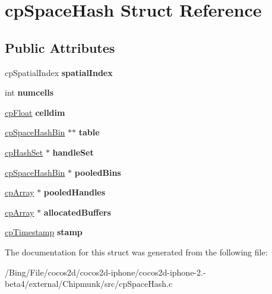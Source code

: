 \hypertarget{structcp_space_hash}{\section{cp\-Space\-Hash Struct Reference}
\label{structcp_space_hash}
}
\subsection*{Public Attributes}
\begin{DoxyCompactItemize}
\item 
\hypertarget{structcp_space_hash_a4d3a762b16dd13259a89dd29ad111676}{cp\-Spatial\-Index {\bfseries spatial\-Index}}\label{structcp_space_hash_a4d3a762b16dd13259a89dd29ad111676}

\item 
\hypertarget{structcp_space_hash_a54f58ef3898f1cc3cb07663b24d3ae02}{int {\bfseries numcells}}\label{structcp_space_hash_a54f58ef3898f1cc3cb07663b24d3ae02}

\item 
\hypertarget{structcp_space_hash_a4266adbf523de2ac29c61da593e5d31f}{\hyperlink{group__basic_types_gac1ed65573e035bf892505768c852d8d3}{cp\-Float} {\bfseries celldim}}\label{structcp_space_hash_a4266adbf523de2ac29c61da593e5d31f}

\item 
\hypertarget{structcp_space_hash_a82c13c0a51da7cdbd0821d940bcf8f63}{\hyperlink{structcp_space_hash_bin}{cp\-Space\-Hash\-Bin} $\ast$$\ast$ {\bfseries table}}\label{structcp_space_hash_a82c13c0a51da7cdbd0821d940bcf8f63}

\item 
\hypertarget{structcp_space_hash_a5b09ebd12dc3b301f94664d0ed744c86}{\hyperlink{structcp_hash_set}{cp\-Hash\-Set} $\ast$ {\bfseries handle\-Set}}\label{structcp_space_hash_a5b09ebd12dc3b301f94664d0ed744c86}

\item 
\hypertarget{structcp_space_hash_a10fbcd62fe9c6bd37366ec4cb102d1cb}{\hyperlink{structcp_space_hash_bin}{cp\-Space\-Hash\-Bin} $\ast$ {\bfseries pooled\-Bins}}\label{structcp_space_hash_a10fbcd62fe9c6bd37366ec4cb102d1cb}

\item 
\hypertarget{structcp_space_hash_ab40934ae0b4d6583f34ed7d8ef6b4d90}{\hyperlink{structcp_array}{cp\-Array} $\ast$ {\bfseries pooled\-Handles}}\label{structcp_space_hash_ab40934ae0b4d6583f34ed7d8ef6b4d90}

\item 
\hypertarget{structcp_space_hash_ac216a2d673aa5473e8579d3ac6a03485}{\hyperlink{structcp_array}{cp\-Array} $\ast$ {\bfseries allocated\-Buffers}}\label{structcp_space_hash_ac216a2d673aa5473e8579d3ac6a03485}

\item 
\hypertarget{structcp_space_hash_a982098abb31ca7d5a47474e042b3dfb5}{\hyperlink{group__basic_types_gaa24652c104082d0725066ea5ac7dc83f}{cp\-Timestamp} {\bfseries stamp}}\label{structcp_space_hash_a982098abb31ca7d5a47474e042b3dfb5}

\end{DoxyCompactItemize}


The documentation for this struct was generated from the following file\-:\begin{DoxyCompactItemize}
\item 
/\-Bing/\-File/cocos2d/cocos2d-\/iphone/cocos2d-\/iphone-\/2.-\/beta4/external/\-Chipmunk/src/cp\-Space\-Hash.\-c\end{DoxyCompactItemize}
